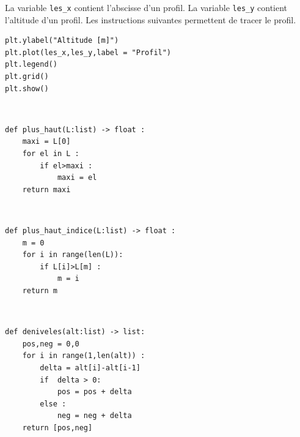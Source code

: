 La variable \texttt{les\_x} contient l'abscisse d'un profil.
La variable \texttt{les\_y} contient l'altitude d'un profil. Les instructions suivantes permettent de tracer le profil.

\begin{lstlisting}
plt.ylabel("Altitude [m]")
plt.plot(les_x,les_y,label = "Profil")
plt.legend()
plt.grid()
plt.show()
\end{lstlisting}




\ifprof
\begin{corrige}~\\
\vspace{-.5cm}
\begin{lstlisting}
def plus_haut(L:list) -> float :
    maxi = L[0]
    for el in L : 
        if el>maxi :
            maxi = el  
    return maxi
\end{lstlisting}
\end{corrige}
\else
\fi


\ifprof
\begin{corrige}~\\
\vspace{-.5cm}
\begin{lstlisting}
def plus_haut_indice(L:list) -> float :
    m = 0
    for i in range(len(L)):
        if L[i]>L[m] :
            m = i  
    return m
\end{lstlisting}
\end{corrige}
\else
\fi




\ifprof
\begin{corrige}~\\
\vspace{-.5cm}
\begin{lstlisting}
def deniveles(alt:list) -> list:
    pos,neg = 0,0
    for i in range(1,len(alt)) : 
        delta = alt[i]-alt[i-1]
        if  delta > 0: 
            pos = pos + delta
        else : 
            neg = neg + delta
    return [pos,neg]
\end{lstlisting}
\end{corrige}
\else
\fi

